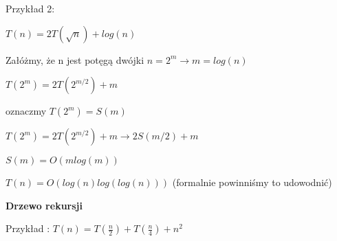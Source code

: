 \documentclass{article}
\begin{document}
\vspace{9\baselineskip}
Przykład 2: \par
\vspace{1\baselineskip}
$T(n) = 2T(\sqrt{n}) + log(n)$ \par
Załóżmy, że n jest potęgą dwójki $n = 2^m \rightarrow m = log(n)$ \par
$T(2^m) = 2T(2^{m/2}) + m$ \par
oznaczmy $T(2^m) = S(m)$ \par
$T(2^m) = 2T(2^{m/2}) + m \rightarrow 2S(m/2) + m$ \par
$S(m) = O(m log(m))$ \par
$T(n) = O(log(n) log(log(n)))$ (formalnie powinniśmy to udowodnić) \par  
\vspace{1\baselineskip}
\textbf{Drzewo rekursji} \par
\vspace{1\baselineskip}
Przykład : $T(n) = T(\frac{n}{2}) +T (\frac{n}{4}) + n^2$ \par
\vspace{1\baselineskip}
\begin{center}
\end{center}
\end{document}
